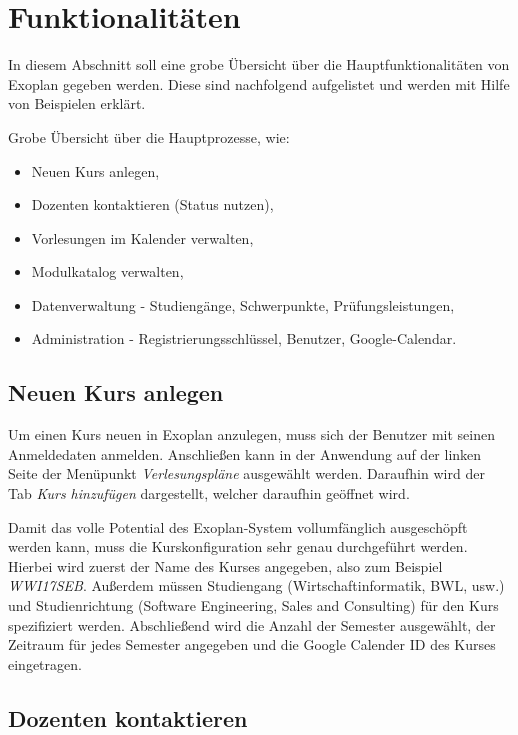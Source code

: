 \section{Funktionalitäten}

In diesem Abschnitt soll eine grobe Übersicht über die Hauptfunktionalitäten von Exoplan gegeben werden. Diese sind nachfolgend aufgelistet und werden mit Hilfe von Beispielen erklärt.

Grobe Übersicht über die Hauptprozesse, wie: 
\begin{itemize}
	\item Neuen Kurs anlegen,
	\item Dozenten kontaktieren (Status nutzen),
	\item Vorlesungen im Kalender verwalten,
	\item Modulkatalog verwalten,
	\item Datenverwaltung - Studiengänge, Schwerpunkte, Prüfungsleistungen,
	\item Administration - Registrierungsschlüssel, Benutzer, Google-Calendar.
\end{itemize}

\subsection{Neuen Kurs anlegen}

Um einen Kurs neuen in Exoplan anzulegen, muss sich der Benutzer mit seinen Anmeldedaten anmelden. Anschließen kann in der Anwendung auf der linken Seite der Menüpunkt \textit{Verlesungspläne} ausgewählt werden. Daraufhin wird der Tab \textit{Kurs hinzufügen} dargestellt, welcher daraufhin geöffnet wird.

Damit das volle Potential des Exoplan-System vollumfänglich ausgeschöpft werden kann, muss die Kurskonfiguration sehr genau durchgeführt werden. Hierbei wird zuerst der Name des Kurses angegeben, also zum Beispiel \textit{WWI17SEB}. Außerdem müssen Studiengang (Wirtschaftinformatik, BWL, usw.) und Studienrichtung (Software Engineering, Sales and Consulting) für den Kurs spezifiziert werden. Abschließend wird die Anzahl der Semester ausgewählt, der Zeitraum für jedes Semester angegeben und die Google Calender ID des Kurses eingetragen.

\subsection{Dozenten kontaktieren}

